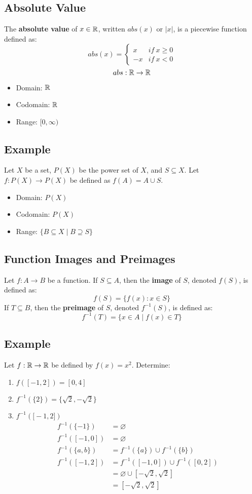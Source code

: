 \documentclass{math}
\begin{document}
\subsection*{Absolute Value}
The \textbf{absolute value} of \( x\in\mathbb{R} \), written \( abs(x) \) or \( |x| \),
is a piecewise function defined as:
\[ abs(x) =
  \begin{cases}
    x & if\ x\geq 0 \\
    -x & if\ x < 0
  \end{cases}
\]
\[ abs:\mathbb{R}\to\mathbb{R} \]
\begin{itemize}
  \item Domain: \( \mathbb{R} \)
  \item Codomain: \( \mathbb{R} \)
  \item Range: \( [0,\infty) \)
\end{itemize}

\subsection*{Example}
Let \( X \) be a set, \( P(X) \) be the power set of \( X \), and
\( S \subseteq X \). Let \( f:P(X)\to P(X) \) be defined as
\( f(A) = A \cup S \).
\begin{itemize}
  \item Domain: \( P(X) \)
  \item Codomain: \( P(X) \)
  \item Range: \( \{B \subseteq X\mid B \supseteq S\} \)
\end{itemize}

\subsection*{Function Images and Preimages}
Let \( f:A\to B \) be a function. If \( S \subseteq A \), then the
\textbf{image} of \( S \), denoted \( f(S) \), is defined as:
\[ f(S) = \{f(x):x\in S \} \]
If \( T \subseteq B \), then the \textbf{preimage} of \( S \), denoted
\( f^{-1}(S) \), is defined as:
\[ f^{-1}(T) = \{x\in A\mid f(x)\in T\} \]

\subsection*{Example}
Let \( f:\mathbb{R}\to\mathbb{R} \) be defined by \( f(x) = x^{2} \). Determine:
\begin{enumerate}
  \item \( f([-1,2]) = [0,4] \)
  \item \( f^{-1}(\{2\})  = \{\sqrt{2},-\sqrt{2}\} \)
  \item \( f^{-1}(\big[-1,2\big]) \)
  \begin{align*}
    f^{-1}(\{-1\}) &= \varnothing \\
    f^{-1}([-1,0]) &= \varnothing \\
    f^{-1}(\{a,b\}) &= f^{-1}(\{a\}) \cup f^{-1}(\{b\}) \\
    f^{-1}([-1,2]) &= f^{-1}([-1,0]) \cup f^{-1}([0,2]) \\
    &= \varnothing \cup [-\sqrt{2},\sqrt{2}] \\
    &= [-\sqrt{2},\sqrt{2}]
  \end{align*}
\end{enumerate}
\end{document}
